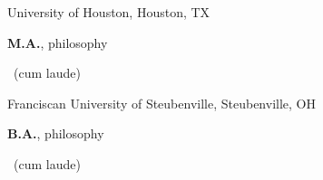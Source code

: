 {%
	University of Houston, Houston, TX}
{%
	\textbf{M.A.}, philosophy\begin{footnotesize}
		~(cum laude)
\end{footnotesize}}
{}
{%
	Franciscan University of Steubenville, Steubenville, OH}
{%
	\textbf{B.A.}, philosophy\begin{footnotesize}
		~(cum laude)
\end{footnotesize}}
{}
